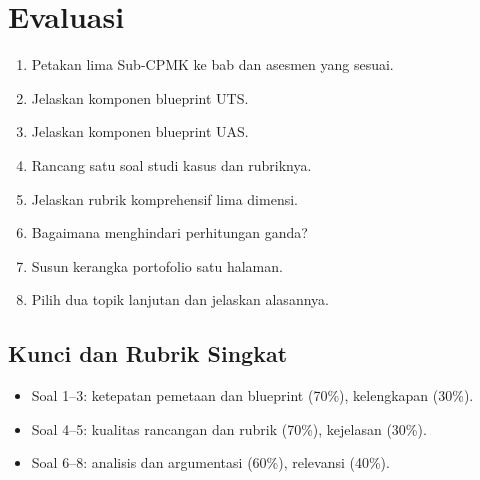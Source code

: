 \section*{Evaluasi}

\begin{enumerate}[label=\arabic*.,leftmargin=*]
  \item Petakan lima Sub-CPMK ke bab dan asesmen yang sesuai.
  \item Jelaskan komponen blueprint UTS.
  \item Jelaskan komponen blueprint UAS.
  \item Rancang satu soal studi kasus dan rubriknya.
  \item Jelaskan rubrik komprehensif lima dimensi.
  \item Bagaimana menghindari perhitungan ganda?
  \item Susun kerangka portofolio satu halaman.
  \item Pilih dua topik lanjutan dan jelaskan alasannya.
\end{enumerate}

\subsection*{Kunci dan Rubrik Singkat}
\begin{itemize}[leftmargin=*]
  \item Soal 1--3: ketepatan pemetaan dan blueprint (70\%),
        kelengkapan (30\%).
  \item Soal 4--5: kualitas rancangan dan rubrik (70\%),
        kejelasan (30\%).
  \item Soal 6--8: analisis dan argumentasi (60\%),
        relevansi (40\%).
\end{itemize}
